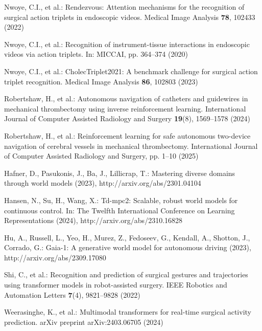 \documentclass[runningheads]{llncs}
\begin{document}
%


\begin{thebibliography}{20}
Nwoye, C.I., et al.: Rendezvous: Attention mechanisms for the recognition of surgical action triplets in endoscopic videos. Medical Image Analysis \textbf{78}, 102433 (2022)

Nwoye, C.I., et al.: Recognition of instrument-tissue interactions in endoscopic videos via action triplets. In: MICCAI, pp. 364--374 (2020)

Nwoye, C.I., et al.: CholecTriplet2021: A benchmark challenge for surgical action triplet recognition. Medical Image Analysis \textbf{86}, 102803 (2023)

Robertshaw, H., et al.: Autonomous navigation of catheters and guidewires in mechanical thrombectomy using inverse reinforcement learning. International Journal of Computer Assisted Radiology and Surgery \textbf{19}(8), 1569--1578 (2024)

Robertshaw, H., et al.: Reinforcement learning for safe autonomous two-device navigation of cerebral vessels in mechanical thrombectomy. International Journal of Computer Assisted Radiology and Surgery, pp. 1--10 (2025)

Hafner, D., Pasukonis, J., Ba, J., Lillicrap, T.: Mastering diverse domains through world models (2023), http://arxiv.org/abs/2301.04104

Hansen, N., Su, H., Wang, X.: Td-mpc2: Scalable, robust world models for continuous control. In: The Twelfth International Conference on Learning Representations (2024), http://arxiv.org/abs/2310.16828

Hu, A., Russell, L., Yeo, H., Murez, Z., Fedoseev, G., Kendall, A., Shotton, J., Corrado, G.: Gaia-1: A generative world model for autonomous driving (2023), http://arxiv.org/abs/2309.17080

Shi, C., et al.: Recognition and prediction of surgical gestures and trajectories using transformer models in robot-assisted surgery. IEEE Robotics and Automation Letters \textbf{7}(4), 9821--9828 (2022)

Weerasinghe, K., et al.: Multimodal transformers for real-time surgical activity prediction. arXiv preprint arXiv:2403.06705 (2024)


\end{thebibliography}
\end{document}
